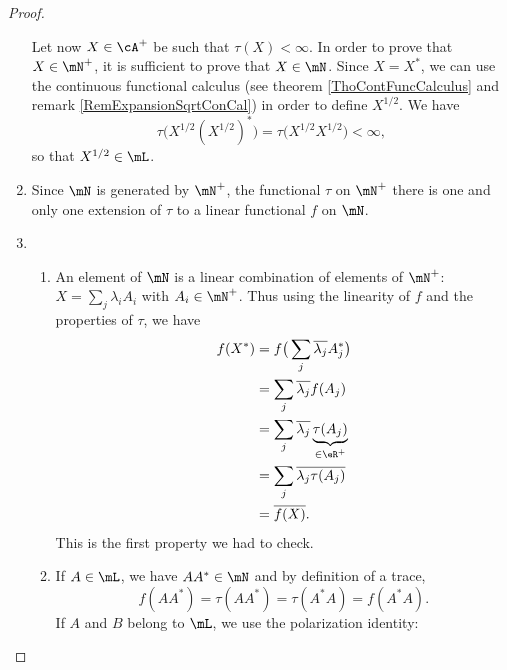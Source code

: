 \begin{proof}
\begin{enumerate}
            Let now $X\in\cA^+$ be such that $\tau(X)<\infty$. In order to prove that $X\in\mN^+$, it is sufficient to prove that $X\in\mN$. Since $X=X^*$, we can use the continuous functional calculus (see theorem \ref{ThoContFuncCalculus} and remark \ref{RemExpansionSqrtConCal}) in order to define $X^{1/2}$. We have
            \begin{equation}
                \tau\big( X^{1/2}(X^{1/2})^* \big)=\tau\big( X^{1/2}X^{1/2} \big)<\infty,
            \end{equation}
            so that $X^{1/2}\in\mL$.
        \item
            Since $\mN$ is generated by $\mN^{+}$, the functional $\tau$ on $\mN^+$ there is one and only one extension of $\tau$ to a linear functional $f$ on $\mN$.
        \item
            \begin{enumerate}
                \item
                    An element of $\mN$ is a linear combination of elements of $\mN^+$: $X=\sum_j\lambda_iA_i$ with $A_i\in\mN^+$. Thus using the linearity of $f$ and the properties of $\tau$, we have
                    \begin{equation}
                        \begin{aligned}[]
                            f(X^*)&=f\big( \sum_j\overline{ \lambda_j }A_j^* \big)\\
                            &=\sum_j\overline{ \lambda_j }f(A_j)\\
                            &=\sum_j\overline{ \lambda_j }\underbrace{\tau(A_j)}_{\in\eR^{+}}\\
                            &=\sum_j\overline{ \lambda_j \tau(A_j)}\\
                            &=\overline{ f(X) }.
                        \end{aligned}
                    \end{equation}
                    This is the first property we had to check.
                \item
                    If $A\in\mL$, we have $AA^*\in\mN$ and by definition of a trace,
                    \begin{equation}
                        f(AA^*)=\tau(AA^*)=\tau(A^*A)=f(A^*A).
                    \end{equation}
                    If $A$ and $B$ belong to $\mL$, we use the polarization identity:
                    \begin{equation}

\end{equation}
\end{enumerate}
\end{enumerate}
\end{proof}
